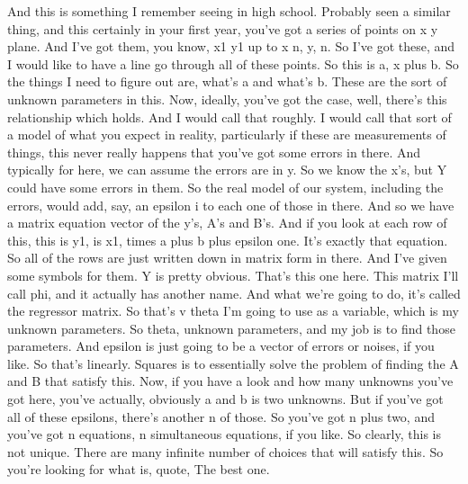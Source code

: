 \documentclass[11pt,a4paper]{article}
\begin{document}
And this is something I remember seeing in high school. Probably seen a similar thing, and this certainly in your first year, you've got a series of points on x y plane. And I've got them, you know, x1 y1 up to x n, y, n. So I've got these, and I would like to have a line go through all of these points. So this is a, x plus b. So the things I need to figure out are, what's a and what's b. These are the sort of unknown parameters in this. Now, ideally, you've got the case, well, there's this relationship which holds. And I would call that roughly. I would call that sort of a model of what you expect in reality, particularly if these are measurements of things, this never really happens that you've got some errors in there. And typically for here, we can assume the errors are in y. So we know the x's, but Y could have some errors in them. So the real model of our system, including the errors, would add, say, an epsilon i to each one of those in there. And so we have a matrix equation vector of the y's, A's and B's. And if you look at each row of this, this is y1, is x1, times a plus b plus epsilon one. It's exactly that equation. So all of the rows are just written down in matrix form in there. And I've given some symbols for them. Y is pretty obvious. That's this one here. This matrix I'll call phi, and it actually has another name. And what we're going to do, it's called the regressor matrix. So that's v theta I'm going to use as a variable, which is my unknown parameters. So theta, unknown parameters, and my job is to find those parameters. And epsilon is just going to be a vector of errors or noises, if you like. So that's linearly. Squares is to essentially solve the problem of finding the A and B that satisfy this. Now, if you have a look and how many unknowns you've got here, you've actually, obviously a and b is two unknowns. But if you've got all of these epsilons, there's another n of those. So you've got n plus two, and you've got n equations, n simultaneous equations, if you like. So clearly, this is not unique. There are many infinite number of choices that will satisfy this. So you're looking for what is, quote, The best one.
\end{document}
